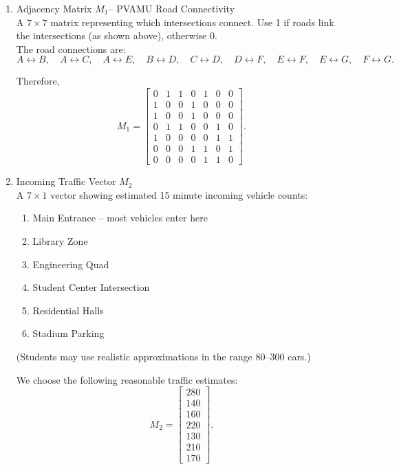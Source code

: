 \documentclass{ximera}
\begin{document}
\begin{enumerate}
    \item Adjacency Matrix $M_1$– PVAMU Road Connectivity\\
    A $7\times 7$ matrix representing which intersections connect. Use 1 if roads link the intersections (as shown above), otherwise 0.\\

    The road connections are:
    \[
    A\leftrightarrow B,\quad A\leftrightarrow C,\quad A\leftrightarrow E,\quad
    B\leftrightarrow D,\quad C\leftrightarrow D,\quad D\leftrightarrow F,\quad
    E\leftrightarrow F,\quad E\leftrightarrow G,\quad F\leftrightarrow G.
    \]

    Therefore,
    \[
    M_1=
    \begin{bmatrix}
    0&1&1&0&1&0&0\\
    1&0&0&1&0&0&0\\
    1&0&0&1&0&0&0\\
    0&1&1&0&0&1&0\\
    1&0&0&0&0&1&1\\
    0&0&0&1&1&0&1\\
    0&0&0&0&1&1&0
    \end{bmatrix}.
    \]

    \item Incoming Traffic Vector $M_2$\\
    A $7\times 1$ vector showing estimated 15 minute incoming vehicle counts:
    \begin{enumerate}    
    \item[A:] Main Entrance – most vehicles enter here
    \item[B:] Library Zone
    \item[C:] Engineering Quad
    \item[D:] Student Center Intersection
    \item[E:] Residential Halls
    \item[F:] Stadium Parking
    \end{enumerate}
    (Students may use realistic approximations in the range 80–300 cars.)

    We choose the following reasonable traffic estimates:
    \[
    M_2=
    \begin{bmatrix}
    280\\
    140\\
    160\\
    220\\
    130\\
    210\\
    170
    \end{bmatrix}.
    \]


\end{enumerate}
\end{document}
